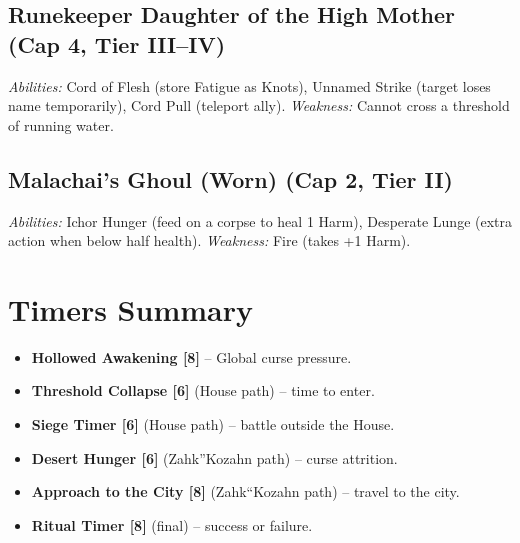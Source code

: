 \documentclass[10pt,twoside]{book}
\begin{document}
\subsection{Runekeeper Daughter of the High Mother (Cap 4, Tier III--IV)}
\textit{Abilities:} Cord of Flesh (store Fatigue as Knots), Unnamed Strike (target loses name temporarily), Cord Pull (teleport ally). \textit{Weakness:} Cannot cross a threshold of running water.

\subsection{Malachai's Ghoul (Worn) (Cap 2, Tier II)}
\textit{Abilities:} Ichor Hunger (feed on a corpse to heal 1 Harm), Desperate Lunge (extra action when below half health). \textit{Weakness:} Fire (takes +1 Harm).

\section{Timers Summary}
\begin{itemize}
\item \textbf{Hollowed Awakening [8]} -- Global curse pressure.
\item \textbf{Threshold Collapse [6]} (House path) -- time to enter.
\item \textbf{Siege Timer [6]} (House path) -- battle outside the House.
\item \textbf{Desert Hunger [6]} (Zahk''Kozahn path) -- curse attrition.
\item \textbf{Approach to the City [8]} (Zahk``Kozahn path) -- travel to the city.
\item \textbf{Ritual Timer [8]} (final) -- success or failure.
\end{itemize}
\end{document}
